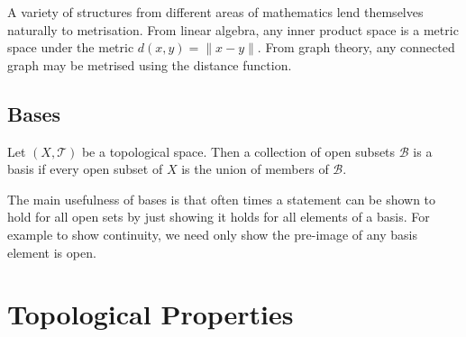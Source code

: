 \documentclass[]{article}
\begin{document}
A variety of structures from different areas of mathematics lend themselves naturally to metrisation. From linear algebra, any inner product space is a metric space under the metric $d(x,y) = \|x-y\|$. From graph theory, any connected graph may be metrised using the distance function.

\subsection{Bases}

\begin{defi} [Basis]
		Let $(X, \mathcal{T})$ be a topological space. Then a collection of open subsets $\mathcal{B}$ is a basis if every open subset of $X$ is the union of members of $\mathcal{B}$.	
\end{defi}

The main usefulness of bases is that often times a statement can be shown to hold for all open sets by just showing it holds for all elements of a basis. For example to show continuity, we need only show the pre-image of any basis element is open.

\section{Topological Properties}
\end{document}
